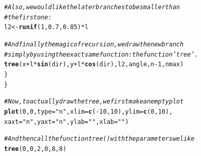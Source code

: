 \documentclass{article}\usepackage[]{graphicx}\usepackage[]{color}
\makeatletter
\newcommand{\hlnum}[1]{\textcolor[rgb]{0.686,0.059,0.569}{#1}}%
\newcommand{\hlstr}[1]{\textcolor[rgb]{0.192,0.494,0.8}{#1}}%
\newcommand{\hlcom}[1]{\textcolor[rgb]{0.678,0.584,0.686}{\textit{#1}}}%
\newcommand{\hlopt}[1]{\textcolor[rgb]{0,0,0}{#1}}%
\newcommand{\hlstd}[1]{\textcolor[rgb]{0.345,0.345,0.345}{#1}}%
\newcommand{\hlkwb}[1]{\textcolor[rgb]{0.69,0.353,0.396}{#1}}%
\newcommand{\hlkwc}[1]{\textcolor[rgb]{0.333,0.667,0.333}{#1}}%
\newcommand{\hlkwd}[1]{\textcolor[rgb]{0.737,0.353,0.396}{\textbf{#1}}}%
\newenvironment{kframe}{%
 \def\at@end@of@kframe{}%
 \ifinner\ifhmode%
  \def\at@end@of@kframe{\end{minipage}}%
  \begin{minipage}{\columnwidth}%
 \fi\fi%
 \def\FrameCommand##1{\hskip\@totalleftmargin \hskip-\fboxsep
 \colorbox{shadecolor}{##1}\hskip-\fboxsep
     \hskip-\linewidth \hskip-\@totalleftmargin \hskip\columnwidth}%
 \MakeFramed {\advance\hsize-\width
   \@totalleftmargin\z@ \linewidth\hsize
   \@setminipage}}%
 {\par\unskip\endMakeFramed%
 \at@end@of@kframe}
\newenvironment{knitrout}{}{} %
\makeatother
\begin{document}
\begin{knitrout}
\begin{kframe}
\begin{alltt}
    \hlcom{# Also, we would like the later branches to be smaller than}
    \hlcom{# the first one:}
    \hlstd{l2}\hlkwb{<-}\hlkwd{runif}\hlstd{(}\hlnum{1}\hlstd{,}\hlnum{0.7}\hlstd{,}\hlnum{0.85}\hlstd{)}\hlopt{*}\hlstd{l}

    \hlcom{# And finally the magic of recursion, we draw the new branch}
    \hlcom{# simply by using theexact same function: the function 'tree'.}
    \hlkwd{tree}\hlstd{(x}\hlopt{+}\hlstd{l}\hlopt{*}\hlkwd{sin}\hlstd{(dir),y}\hlopt{+}\hlstd{l}\hlopt{*}\hlkwd{cos}\hlstd{(dir),l2,angle,n}\hlopt{-}\hlnum{1}\hlstd{,nmax)}
  \hlstd{\}}
\hlstd{\}}

\hlcom{# Now, to actually draw the tree, we first make an empty plot}
\hlkwd{plot}\hlstd{(}\hlnum{0}\hlstd{,}\hlnum{0}\hlstd{,}\hlkwc{type}\hlstd{=}\hlstr{"n"}\hlstd{,}\hlkwc{xlim}\hlstd{=}\hlkwd{c}\hlstd{(}\hlopt{-}\hlnum{10}\hlstd{,}\hlnum{10}\hlstd{),}\hlkwc{ylim}\hlstd{=}\hlkwd{c}\hlstd{(}\hlnum{0}\hlstd{,}\hlnum{10}\hlstd{),}
     \hlkwc{xaxt}\hlstd{=}\hlstr{"n"}\hlstd{,}\hlkwc{yaxt}\hlstd{=}\hlstr{"n"}\hlstd{,}\hlkwc{ylab}\hlstd{=}\hlstr{""}\hlstd{,}\hlkwc{xlab}\hlstd{=}\hlstr{""}\hlstd{)}

\hlcom{# And then call the function tree() with the parameters we like}
\hlkwd{tree}\hlstd{(}\hlnum{0}\hlstd{,}\hlnum{0}\hlstd{,}\hlnum{2}\hlstd{,}\hlnum{0}\hlstd{,}\hlnum{8}\hlstd{,}\hlnum{8}\hlstd{)}
\end{alltt}
\end{kframe}
\end{knitrout}
\end{document}

